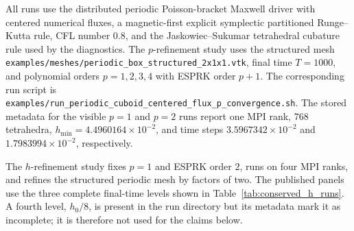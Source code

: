 \documentclass[11pt]{article}
\begin{document}
All runs use the distributed periodic Poisson-bracket Maxwell driver with
centered numerical fluxes, a magnetic-first explicit symplectic partitioned
Runge--Kutta rule, CFL number $0.8$, and the Jaskowiec--Sukumar tetrahedral
cubature rule used by the diagnostics.  The $p$-refinement study uses the
structured mesh
\texttt{examples/meshes/periodic\_box\_structured\_2x1x1.vtk}, final time
$T=1000$, and polynomial orders $p=1,2,3,4$ with ESPRK order $p+1$.  The
corresponding run script is
\texttt{examples/run\_periodic\_cuboid\_centered\_flux\_p\_convergence.sh}.
The stored metadata for the visible $p=1$ and $p=2$ runs report one MPI rank,
768 tetrahedra, $h_{\min}=4.4960164\times 10^{-2}$, and time steps
$3.5967342\times10^{-2}$ and $1.7983994\times10^{-2}$, respectively.

The $h$-refinement study fixes $p=1$ and ESPRK order $2$, runs on four MPI
ranks, and refines the structured periodic mesh by factors of two.  The
published panels use the three complete final-time levels shown in
Table~\ref{tab:conserved_h_runs}.  A fourth level, $h_0/8$, is present in the
run directory but its metadata mark it as incomplete; it is therefore not used
for the claims below.

\begin{table}[htbp]
  \centering
  \caption{Reproducibility data for the $h$-refinement conserved-quantity
  experiment.  The data are taken from the run metadata in
  \texttt{output/periodic\_cuboid\_cf\_structured\_p1\_h*}.}
  \label{tab:conserved_h_runs}
\end{table}
\end{document}

